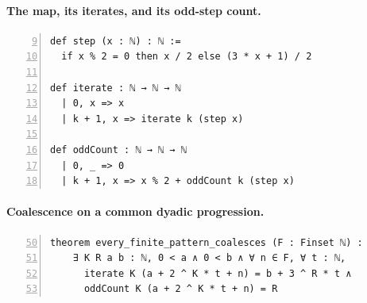\documentclass[11pt,a4paper]{article}
\begin{document}
\noindent\begin{minipage}{\linewidth}
\paragraph{The map, its iterates, and its odd-step count.}\mbox{}\par
{}\par
\begin{Verbatim}[formatcom=\leanappendixfont,fontsize=\scriptsize,numbers=left,firstnumber=9,numbersep=5pt,xleftmargin=18pt]
def step (x : ℕ) : ℕ :=
  if x % 2 = 0 then x / 2 else (3 * x + 1) / 2

def iterate : ℕ → ℕ → ℕ
  | 0, x => x
  | k + 1, x => iterate k (step x)

def oddCount : ℕ → ℕ → ℕ
  | 0, _ => 0
  | k + 1, x => x % 2 + oddCount k (step x)
\end{Verbatim}
\end{minipage}\par\medskip

\noindent\begin{minipage}{\linewidth}
\paragraph{Coalescence on a common dyadic progression.}\mbox{}\par
{}\par
\begin{Verbatim}[formatcom=\leanappendixfont,fontsize=\scriptsize,numbers=left,firstnumber=50,numbersep=5pt,xleftmargin=18pt]
theorem every_finite_pattern_coalesces (F : Finset ℕ) :
    ∃ K R a b : ℕ, 0 < a ∧ 0 < b ∧ ∀ n ∈ F, ∀ t : ℕ,
      iterate K (a + 2 ^ K * t + n) = b + 3 ^ R * t ∧
      oddCount K (a + 2 ^ K * t + n) = R
\end{Verbatim}
\end{minipage}\par\medskip
\end{document}

